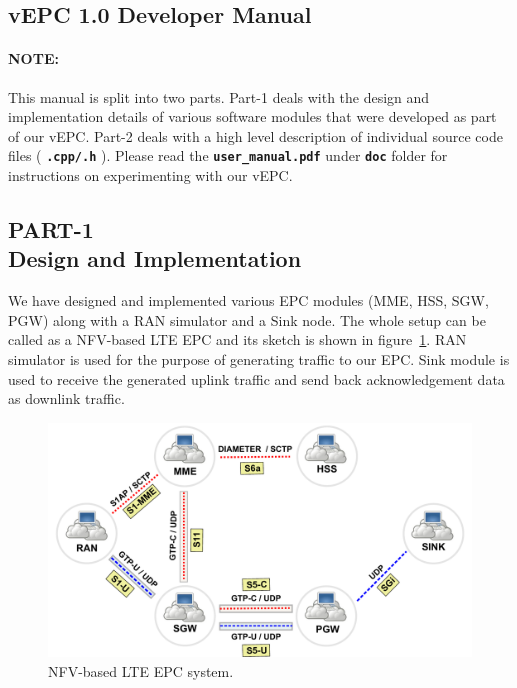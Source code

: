 \documentclass[hidelinks]{report}
\newcommand{\cf}[1] {
	\textbf{\texttt{#1}}
}
\begin{document}

\begin{center}
\section*{vEPC 1.0 Developer Manual}
\end{center}

\paragraph*{NOTE:}

This manual is split into two parts. Part-1 deals with the design and implementation details of various software modules that were developed as part of our vEPC. Part-2 deals with a high level description of individual source code files (\cf{.cpp/.h}). Please read the \cf{user\_manual.pdf} under \cf{doc} folder for instructions on experimenting with our vEPC.

\begin{center}

\subsection*{PART-1 \\ Design and Implementation}

\end{center}

We have designed and implemented various EPC modules (MME, HSS, SGW, PGW) along with a RAN simulator and a Sink node. The whole setup can be called as a NFV-based LTE EPC and its sketch is shown in figure~\ref{nfv_lte_epc}. RAN simulator is used for the purpose of generating traffic to our EPC. Sink module is used to receive the generated uplink traffic and send back acknowledgement data as downlink traffic.

\begin{figure}[H]

\centering
\includegraphics[scale=0.4]{nfv_lte_epc}
\caption{NFV-based LTE EPC system.}
\label{nfv_lte_epc}

\end{figure}
\end{document}

